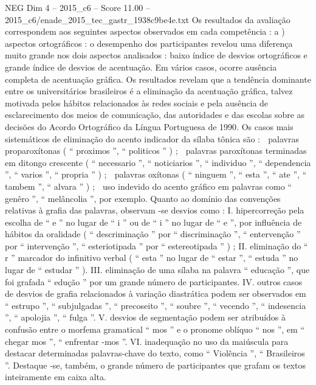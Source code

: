 \begin{textsample}{NEG Dim 4 – 2015\_c6 – Score 11.00 – 2015\_c6/enade\_2015\_tec\_gastr\_1938c9be4e.txt}
Os resultados da avaliação correspondem aos seguintes aspectos observados em cada competência : a ) aspectos ortográficos : o desempenho dos participantes revelou uma diferença muito grande nos dois aspectos analisados : baixo índice de desvios ortográficos e grande índice de desvios de acentuação.
Em vários casos, ocorre ausência completa de acentuação gráfica.
Os resultados revelam que a tendência dominante entre os universitários brasileiros é a eliminação da acentuação gráfica, talvez motivada pelos hábitos relacionados às redes sociais e pela ausência de esclarecimento dos meios de comunicação, das autoridades e das escolas sobre as decisões do Acordo Ortográfico da Língua Portuguesa de 1990.
Os casos mais sistemáticos de eliminação do acento indicador da sílaba tônica são :  palavras proparoxítonas ( “ proximos ”, “ politicos ” ) ;  palavras paroxítonas terminadas em ditongo crescente ( “ necessario ”, “ noticiarios ”, “ individuo ”, “ dependencia ”, “ varios ”, “ propria ” ) ;  palavras oxítonas ( “ ninguem ”, “ esta ”, “ ate ”, “ tambem ”, “ alvara ” ) ;  uso indevido do acento gráfico em palavras como “ genêro ”, “ melâncolia ”, por exemplo.
Quanto ao domínio das convenções relativas à grafia das palavras, observam -se desvios como : I. hipercorreção pela escolha de “ e ” no lugar de “ i ” ou de “ i ” no lugar de “ e ”, por influência de hábitos da oralidade ( “ descriminação ” por “ discriminação ”, “ entervenção ” por “ intervenção ”, “ esteriotipada ” por “ estereotipada ” ) ; II. eliminação do “ r ” marcador do infinitivo verbal ( “ esta ” no lugar de “ estar ”, “ estuda ” no lugar de “ estudar ” ).
III. eliminação de uma sílaba na palavra “ educação ”, que foi grafada “ edução ” por um grande número de participantes.
IV. outros casos de desvios de grafia relacionados à variação diastrática podem ser observados em “ estrupo ”, “ subjulgadas ”, “ precoseito ”, “ soubre ”, “ vecendo ”, “ indesencia ”, “ apolojia ”, “ fulga ”.
V. desvios de segmentação podem ser atribuídos à confusão entre o morfema gramatical “ mos ” e o pronome oblíquo “ nos ”, em “ chegar mos ”, “ enfrentar -mos ”.
VI. inadequação no uso da maiúscula para destacar determinadas palavras-chave do texto, como “ Violência ”, “ Brasileiros ”.
Destaque -se, também, o grande número de participantes que grafam os textos inteiramente em caixa alta.

\end{textsample}
